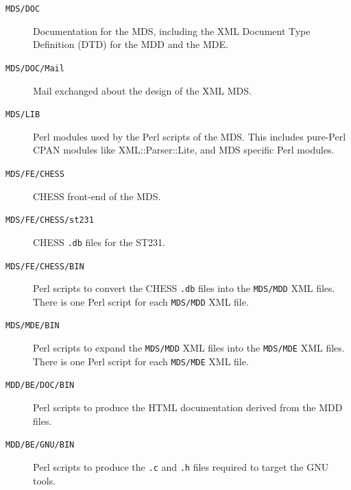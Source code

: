 \documentclass[11pt,a4paper]{article}
\begin{document}
\begin{description}

\item[\texttt{MDS/DOC}] Documentation for the MDS, including the XML Document
Type Definition (DTD) for the MDD and the MDE.

\item[\texttt{MDS/DOC/Mail}] Mail exchanged about the design of the XML MDS.

\item[\texttt{MDS/LIB}] Perl modules used by the Perl scripts of the MDS. This
includes pure-Perl CPAN modules like XML::Parser::Lite, and MDS specific Perl
modules.

\item[\texttt{MDS/FE/CHESS}] CHESS front-end of the MDS.

\item[\texttt{MDS/FE/CHESS/st231}] CHESS \texttt{.db} files for the ST231.

\item[\texttt{MDS/FE/CHESS/BIN}] Perl scripts to convert the CHESS \texttt{.db}
files into the \texttt{MDS/MDD} XML files. There is one Perl script for each
\texttt{MDS/MDD} XML file.

\item[\texttt{MDS/MDE/BIN}] Perl scripts to expand the \texttt{MDS/MDD} XML
files into the \texttt{MDS/MDE} XML files. There is one Perl script for each
\texttt{MDS/MDE} XML file.

\item[\texttt{MDD/BE/DOC/BIN}] Perl scripts to produce the HTML documentation
derived from the MDD files.

\item[\texttt{MDD/BE/GNU/BIN}] Perl scripts to produce the \texttt{.c} and
\texttt{.h} files required to target the GNU tools.

\end{description}
\end{document}
